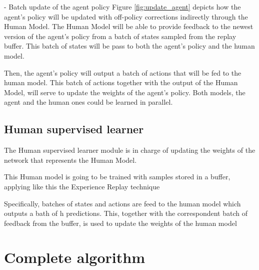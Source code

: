- Batch update of the agent policy
Figure \ref{fig:update_agent} depicts how the agent's policy will be updated with off-policy corrections indirectly through the Human Model. The Human Model will be able to provide feedback to the newest version of the agent’s policy from a batch of states sampled from the replay buffer. This batch of states will be pass to both the agent's policy and the human model. 

Then, the agent's policy will output a batch of actions that will be fed to the human model. This batch of actions together with the output of the Human Model, will serve to update the weights of the agent's policy. Both models, the agent and the human ones could be learned in parallel.



\subsection*{Human supervised learner}

The Human supervised learner module is in charge of updating the weights of the network that represents the Human Model. 

This Human model is going to be trained with samples stored in a buffer, applying like this the Experience Replay technique

Specifically, batches of states and actions are feed to the human model which outputs a bath of h predictions. 
This, together with the correspondent batch of feedback from the buffer, is used to update the weights of the human model






\section{Complete algorithm}
\label{section:Complete algorithm}


